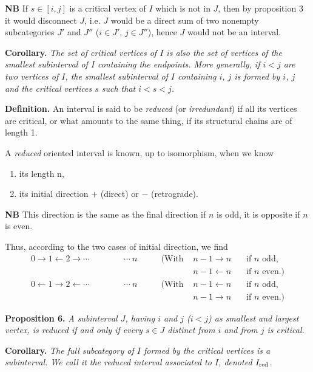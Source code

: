 \documentclass[11pt]{article}
\newcommand{\printedpage}[1]{\marginpar{\footnotesize p.~#1}}
\newcommand{\msp}[1]{\marginpar{\footnotesize [#1]}}
\begin{document}
\textbf{NB} If $s \in [i,j]$ is a critical vertex of $I$ which is not in $J$, then by proposition 3 it would disconnect $J$, i.e. $J$ would be a direct sum of two nonempty subcategories $J'$ and $J''$ ($i \in J'$, $j \in J''$), hence $J$ would not be an interval.

\msp{page 12}

\textbf{Corollary.} \textit{The set of critical vertices of $I$ is also the set of vertices of the smallest subinterval of $I$ containing the endpoints. More generally, if $i < j$ are two vertices of $I$, the smallest subinterval of $I$ containing $i$, $j$ is formed by $i$, $j$ and the critical vertices $s$ such that $i < s < j$.}

\textbf{Definition.} An interval is said to be \textit{reduced} (or \textit{irredundant}) if all its vertices are critical, or what amounts to the same thing, if its structural chains are of length 1.

A \textit{reduced} oriented interval is known, up to isomorphism, when we know
\begin{enumerate}
\item[a)] its length $\mathrm{n}$,
\item[b)] its initial direction $+$ (direct) or $-$ (retrograde).
\end{enumerate}

\textbf{NB} This direction is the same as the final direction if $n$ is odd, it is opposite if $n$ is even.

Thus, according to the two cases of initial direction, we find
\[
\begin{aligned}
0 \longrightarrow 1 \longleftarrow 2 \longrightarrow \cdots \qquad\qquad \cdots\ n & \qquad (\text{With } & n-1 \longrightarrow n & \quad \text{if } n \text{ odd,}\\
& & n-1 \longleftarrow n & \quad \text{if } n \text{ even.)}\\
0 \longleftarrow 1 \longrightarrow 2 \longleftarrow \cdots \qquad\qquad \cdots\ n & \qquad (\text{With } & n-1 \longleftarrow n & \quad \text{if } n \text{ odd,}\\
& & n-1 \longrightarrow n & \quad \text{if } n \text{ even.)}
\end{aligned}
\]

\printedpage{8}

\textbf{Proposition 6.} \textit{A subinterval $J$, having $i$ and $j$ ($i < j$) as smallest and largest vertex, is reduced if and only if every $s \in J$ distinct from $i$ and from $j$ is critical.}

\textbf{Corollary.} \textit{The full subcategory of $I$ formed by the critical vertices is a subinterval. We call it the reduced interval associated to $I$, denoted $I_{\textup{red}}$.}
\end{document}
